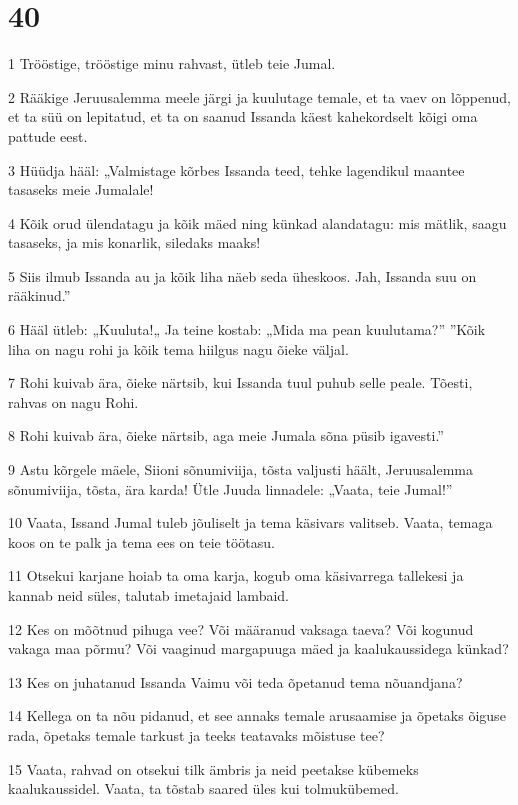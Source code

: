 \chapter{40}

\par 1 Trööstige, trööstige minu rahvast, ütleb teie Jumal.
\par 2 Rääkige Jeruusalemma meele järgi ja kuulutage temale, et ta vaev on lõppenud, et ta süü on lepitatud, et ta on saanud Issanda käest kahekordselt kõigi oma pattude eest.
\par 3 Hüüdja hääl: „Valmistage kõrbes Issanda teed, tehke lagendikul maantee tasaseks meie Jumalale!
\par 4 Kõik orud ülendatagu ja kõik mäed ning künkad alandatagu: mis mätlik, saagu tasaseks, ja mis konarlik, siledaks maaks!
\par 5 Siis ilmub Issanda au ja kõik liha näeb seda üheskoos. Jah, Issanda suu on rääkinud.”
\par 6 Hääl ütleb: „Kuuluta!„ Ja teine kostab: „Mida ma pean kuulutama?” ”Kõik liha on nagu rohi ja kõik tema hiilgus nagu õieke väljal.
\par 7 Rohi kuivab ära, õieke närtsib, kui Issanda tuul puhub selle peale. Tõesti, rahvas on nagu Rohi.
\par 8 Rohi kuivab ära, õieke närtsib, aga meie Jumala sõna püsib igavesti.”
\par 9 Astu kõrgele mäele, Siioni sõnumiviija, tõsta valjusti häält, Jeruusalemma sõnumiviija, tõsta, ära karda! Ütle Juuda linnadele: „Vaata, teie Jumal!”
\par 10 Vaata, Issand Jumal tuleb jõuliselt ja tema käsivars valitseb. Vaata, temaga koos on te palk ja tema ees on teie töötasu.
\par 11 Otsekui karjane hoiab ta oma karja, kogub oma käsivarrega tallekesi ja kannab neid süles, talutab imetajaid lambaid.
\par 12 Kes on mõõtnud pihuga vee? Või määranud vaksaga taeva? Või kogunud vakaga maa põrmu? Või vaaginud margapuuga mäed ja kaalukaussidega künkad?
\par 13 Kes on juhatanud Issanda Vaimu või teda õpetanud tema nõuandjana?
\par 14 Kellega on ta nõu pidanud, et see annaks temale arusaamise ja õpetaks õiguse rada, õpetaks temale tarkust ja teeks teatavaks mõistuse tee?
\par 15 Vaata, rahvad on otsekui tilk ämbris ja neid peetakse kübemeks kaalukaussidel. Vaata, ta tõstab saared üles kui tolmukübemed.
